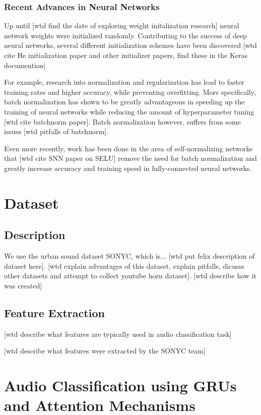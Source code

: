 \subsection{Recent Advances in Neural Networks}

Up until [wtd find the date of exploring weight initalization research] neural network weights were initialized randomly.  Contributing to the success of deep neural networks, several different initialization schemes have been discovered [wtd cite He initialization paper and other initializer papers, find these in the Keras documention]

For example, research into normalization and regularization has lead to faster training rates and higher accuracy, while preventing overfitting.  More specifically, batch normalization has shown to be greatly advantageous in speeding up the training of neural networks while reducing the amount of hyperparameter tuning [wtd cite batchnorm paper].  Batch normalization however, suffers from some issues [wtd pitfalls of batchnorm].

Even more recently, work has been done in the area of self-normalizing networks that [wtd cite SNN paper on SELU] remove the need for batch normalization and greatly increase accuracy and training speed in fully-connected neural networks.

\chapter{Dataset}

\section{Description}

We use the urban sound dataset SONYC, which is... [wtd put felix description of dataset here]. [wtd explain advantages of this dataset, explain pitfalls, dicusss other datasets and attempt to collect youtube horn dataset].  [wtd describe how it was created]

\section{Feature Extraction}

[wtd describe what features are typically used in audio classification task]

[wtd describe what features were extracted by the SONYC team]

\chapter{Audio Classification using GRUs and Attention Mechanisms}

